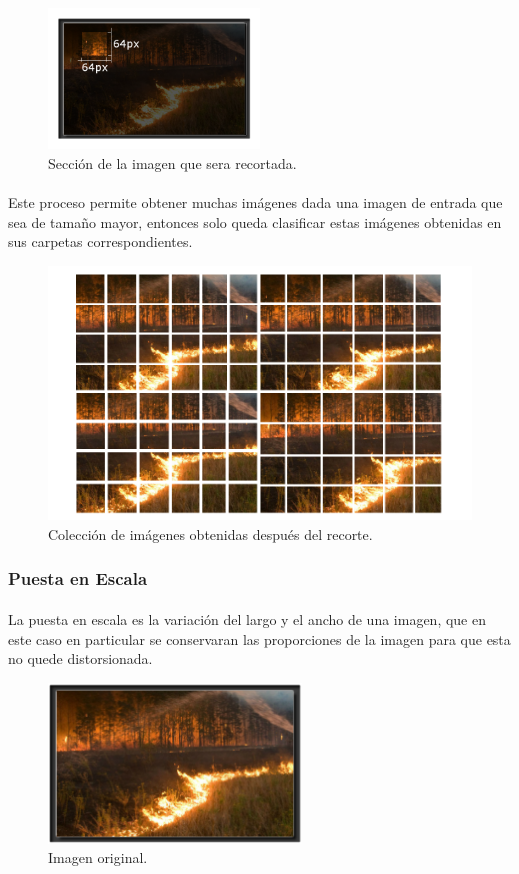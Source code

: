 \begin{figure}[h!]
\centering
\includegraphics[width=0.5\textwidth , frame]{./imagenes/tratamiento/recorte}
\caption{Sección de la imagen que sera recortada.}
\label{fig:sectorRecorte}
\end{figure}

\paragraph{} Este proceso permite obtener muchas imágenes dada una imagen de entrada que sea de tamaño mayor, entonces solo queda clasificar estas imágenes obtenidas en sus carpetas correspondientes.

\begin{figure}[h!]
\centering
\includegraphics[width=0.5\linewidth , frame]{./imagenes/tratamiento/coleccion}
\caption{Colección de imágenes obtenidas después del recorte.}
\label{fig:coleccion}
\end{figure}

\subsubsection{Puesta en Escala}

\paragraph{} La puesta en escala es la variación del largo y el ancho de una imagen, que en este caso en particular se conservaran las proporciones de la imagen para que esta no quede distorsionada.

\begin{figure}[h!]
\centering
\includegraphics[width=0.6\textwidth , frame]{./imagenes/tratamiento/full_image}
\caption{Imagen original.}
\label{fig:coleccion}
\end{figure}

